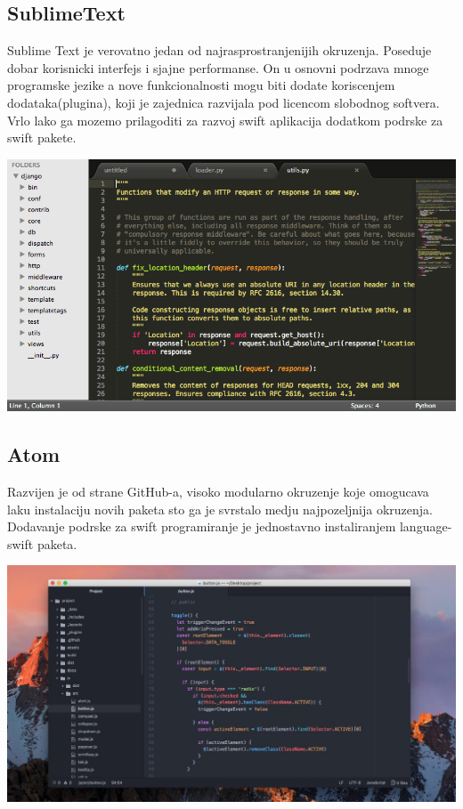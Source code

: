 \documentclass[a4paper]{article}
\begin{document}
\subsection{SublimeText}
\label{subsec:podnaslovSublimeText}

\vspace{5mm}




Sublime Text je verovatno jedan od najrasprostranjenijih okruzenja. Poseduje dobar korisnicki interfejs i sjajne performanse. On u osnovni podrzava mnoge programske jezike a nove funkcionalnosti mogu biti dodate koriscenjem dodataka(plugina), koji je zajednica razvijala pod licencom slobodnog softvera. Vrlo lako ga mozemo prilagoditi za razvoj swift aplikacija dodatkom podrske za swift pakete.
\vspace{5mm}


\includegraphics[scale=0.3]{sublime.png}

\subsection{Atom}
\label{subsec:podnaslovAtom}
\vspace{5mm}
Razvijen je od strane GitHub-a, visoko modularno okruzenje koje omogucava laku instalaciju novih paketa sto ga je svrstalo medju najpozeljnija okruzenja. Dodavanje podrske za swift programiranje je jednostavno instaliranjem language-swift paketa.

\vspace{5mm}

\includegraphics[scale=0.2]{atom.jpg}
\vspace{20mm}
\end{document}
